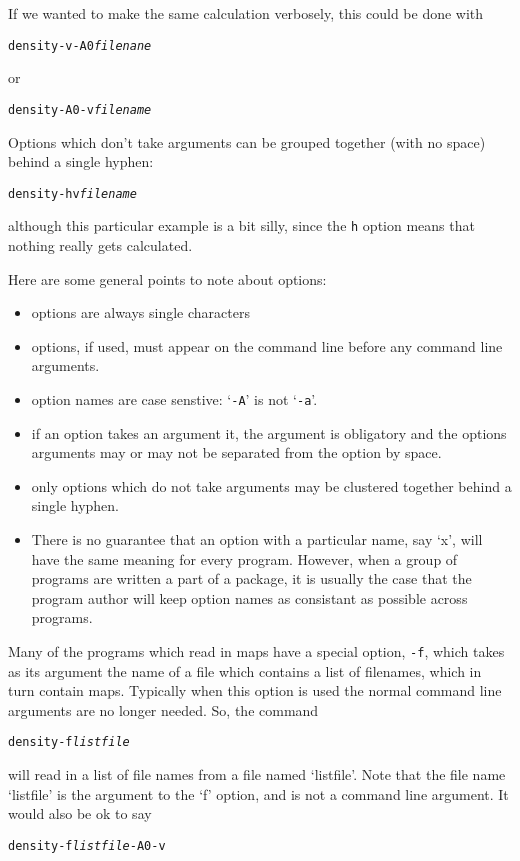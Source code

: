 \documentclass[%
	11pt,
        a4paper,
        twoside]{workrep}
\newcommand*{\opt}[1]{\texttt{#1}}		%
\begin{document}
If we wanted to make the same calculation verbosely, this could be done
with
\begin{alltt}
  density -v -A0 \emph{filenane}
\end{alltt}
or
\begin{alltt}
  density -A0 -v \emph{filename}
\end{alltt}

Options which don't take arguments can be grouped together (with no
space) behind a single hyphen:
\begin{alltt}
  density -hv \emph{filename}
\end{alltt}
although this particular example is a bit silly, since the \texttt{h}
option means that nothing really gets calculated.

Here are some general points to note about options:

\begin{itemize}
\item options are always single characters
\item options, if used, must appear on the command line before
   any command line arguments.
\item option names are case senstive:  `\opt{-A}' is not `\opt{-a}'.
\item if an option takes an argument it, the argument is obligatory
  and the options arguments may or may not be separated from the option
  by space.
\item only options which do not take arguments may be clustered together
 behind a single hyphen.
\item There is no guarantee that an option with a particular name,
  say `x', will have the same meaning for every program.  However,
  when a group of programs are written a part of a package, it
  is usually the case that the program author will keep option
  names as consistant as possible across programs.
\end{itemize}

Many of the programs which read in maps have a special option, \texttt{-f},
which takes as its argument the name of a file which contains a list
of filenames, which in turn contain maps.  Typically when this option
is used the normal command line arguments are no longer needed.  So,
the command
\begin{alltt}
  density -f \emph{listfile}
\end{alltt}
will read in a list of file names from a file named `listfile'.  Note
that the file name `listfile' is the argument to the `f' option, and
is not a command line argument.  It would also be ok to say
\begin{alltt}
  density -f\emph{listfile} -A 0 -v
\end{alltt}
\end{document}
